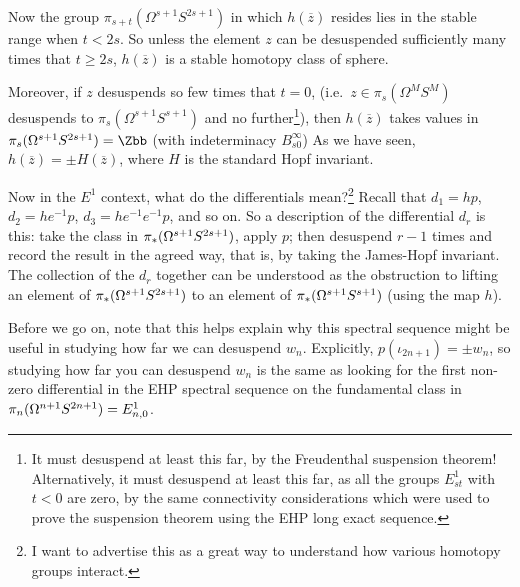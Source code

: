 \begin{enumerate}
Now the group $\pi_{s+t}(\Omega^{s+1}S^{2s+1})$ in which $h(\overline z)$ resides lies in the stable range when $t<2s$. So unless the element $z$ can be desuspended sufficiently many times that $t\geq2s$, $h(\overline z)$ is a stable homotopy class of sphere.

Moreover, if $z$ desuspends so few times that $t=0$, (i.e.\ $z\in\pi_s(\Omega^M S^M)$ desuspends to $\pi_s(\Omega^{s+1} S^{s+1})$ and no further\footnote{It must desuspend at least this far, by the Freudenthal suspension theorem! Alternatively, it must desuspend at least this far, as all the groups $E_{st}^1$ with $t<0$ are zero, by the same connectivity considerations which were used to prove the suspension theorem using the EHP long exact sequence.}), then $h(\overline z)$ takes values in $\pi_{s}(\Omega^{s+1}S^{2s+1})=\Zbb$ (with indeterminacy $B_{s0}^\infty$) As we have seen, $h(\overline z)=\pm H(\overline z)$, where $H$ is the standard Hopf invariant.
\end{enumerate}



Now in the $E^1$ context, what do the differentials mean?\footnote{I want to advertise this as a great way to understand how various homotopy groups interact.}  Recall that $d_1 = hp$, $d_2 = he^{-1} p$, $d_3 = he^{-1} e^{-1} p$, and so on.  So a description of the differential $d_r$ is this: take the class in $\pi_* (\Omega^{s+1} S^{2s+1})$, apply $p$; then desuspend $r-1$ times and record the result in the agreed way, that is, by taking the James-Hopf invariant. The collection of the $d_r$ together can be understood as the obstruction to lifting an element of $\pi_*(\Omega^{s+1} S^{2s+1})$ to an element of $\pi_*(\Omega^{s+1} S^{s+1})$ (using the map $h$).

Before we go on, note that this helps explain why this spectral sequence might be useful in studying how far we can desuspend $w_n$. Explicitly, $p(\iota_{2n+1}) = \pm w_n$, so studying how far you can desuspend $w_n$ is the same as looking for the first non-zero differential in the EHP spectral sequence on the fundamental class in $\pi_n (\Omega^{n+1} S^{2n+1})=E^1_{n,0}$.

